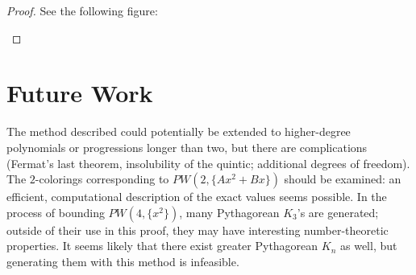 \documentclass[a4paper]{amsproc}
\theoremstyle{plain}
\theoremstyle{named}
\begin{document}
\begin{proof}
See the following figure:

\begin{figure}[H]
\caption{}
\label{fig:M2}
\end{figure}

\end{proof}

\section{Future Work}

The method described could potentially be extended to higher-degree polynomials or progressions longer than two, but there are complications
(Fermat's last theorem, insolubility of the quintic; additional degrees of freedom).
The $2$-colorings corresponding to $PW(2,\{Ax^2+Bx\})$ should be examined: an efficient, computational description of the exact values seems possible.
In the process of bounding $PW(4, \{x^2\})$, many Pythagorean $K_3$'s are generated;
outside of their use in this proof, they may have interesting number-theoretic properties.
It seems likely that there exist greater Pythagorean $K_n$ as well, but generating them with this method is infeasible.
\end{document}
